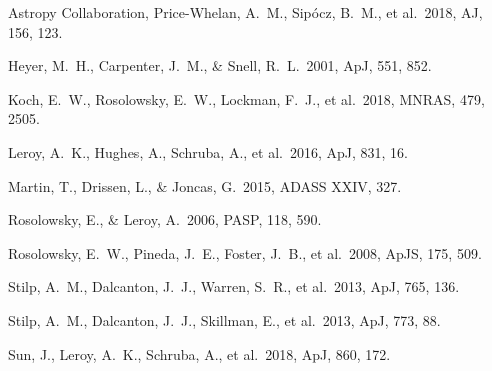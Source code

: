 \documentclass{rnaastex}
\begin{document}
\begin{thebibliography}{}

 Astropy Collaboration, Price-Whelan, A.~M., Sip{\'{o}}cz, B.~M., et al.\ 2018, AJ, 156, 123.

 Heyer, M.~H., Carpenter, J.~M., \& Snell, R.~L.\ 2001, ApJ, 551, 852.

 Koch, E.~W., Rosolowsky, E.~W., Lockman, F.~J., et al.\ 2018, MNRAS, 479, 2505.

 Leroy, A.~K., Hughes, A., Schruba, A., et al.\ 2016, ApJ, 831, 16.

 Martin, T., Drissen, L., \& Joncas, G.\ 2015, ADASS XXIV, 327.

 Rosolowsky, E., \& Leroy, A.\ 2006, PASP, 118, 590.

 Rosolowsky, E.~W., Pineda, J.~E., Foster, J.~B., et al.\ 2008, ApJS, 175, 509.

 Stilp, A.~M., Dalcanton, J.~J., Warren, S.~R., et al.\ 2013, ApJ, 765, 136.

 Stilp, A.~M., Dalcanton, J.~J., Skillman, E., et al.\ 2013, ApJ, 773, 88.

 Sun, J., Leroy, A.~K., Schruba, A., et al.\ 2018, ApJ, 860, 172.


\end{thebibliography}
\end{document}
